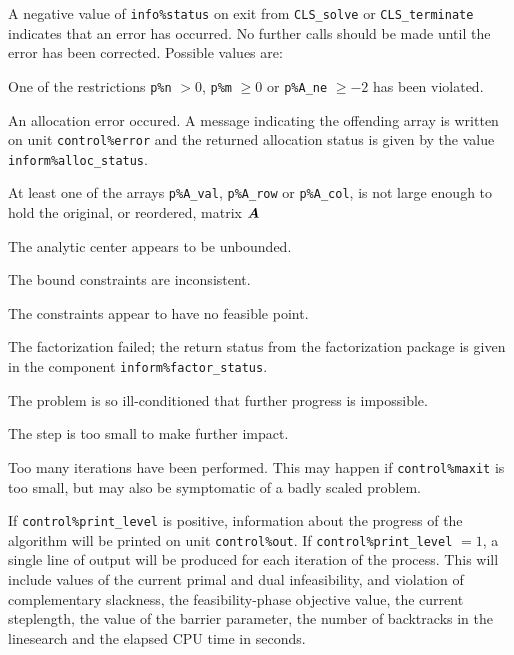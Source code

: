 \documentclass{galahad}
\newcommand{\packagename}{CLS}
\begin{document}

\galerrors
A negative value of {\tt info\%status} on exit from 
{\tt \packagename\_solve}
or 
{\tt \packagename\_terminate}
indicates that an error has occurred. No further calls should be made
until the error has been corrected. Possible values are:

\begin{description}

 One of the restrictions {\tt p\%n} $> 0$, {\tt p\%m} $\geq  0$ or
    {\tt p\%A\_ne} $\geq -2$ has been violated.

 An allocation error occured. A message indicating the offending 
 array is written on unit {\tt control\%error} and the returned allocation 
 status is given by the value {\tt inform\%alloc\_status}.

 At least one of the arrays 
 {\tt p\%A\_val}, {\tt p\%A\_row} or {\tt p\%A\_col},
 is not large enough to hold the original, or reordered, matrix ${\bm{A}}$

 The analytic center appears to be unbounded.

 The bound constraints are inconsistent.

 The constraints appear to have no feasible point.

 The factorization failed; the return status from the factorization
    package is given in the component {\tt inform\%fac\-t\-or\_status}.

 The problem is so ill-conditioned that further progress is impossible.

 The step is too small to make further impact.

 Too many iterations have been performed. This may happen if
    {\tt control\%maxit} is too small, but may also be symptomatic of 
    a badly scaled problem.

\end{description}


\galinfo
If {\tt control\%print\_level} is positive, information about the progress 
of the algorithm will be printed on unit {\tt control\-\%out}.
If {\tt control\%print\_level} $= 1$, a single line of output will be produced 
for each iteration of the process. 
This will include values of the current primal and dual infeasibility, and
violation of complementary slackness, the feasibility-phase objective value,
the current steplength, the value of the barrier parameter, the
number of backtracks in the linesearch and the elapsed CPU time in seconds.
\end{document}
